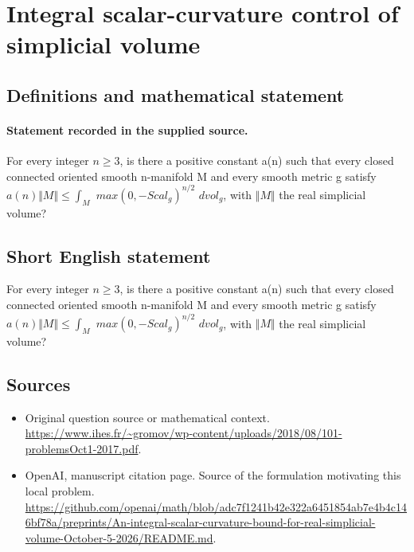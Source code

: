 \documentclass[11pt]{article}
\begin{document}
\section*{Integral scalar-curvature control of simplicial volume}\label{statement}
\subsection{Definitions and mathematical statement}
\paragraph{Statement recorded in the supplied source.}
For every integer $n\geq 3$, is there a positive constant a(n) such that every closed connected oriented smooth n-manifold M and every smooth metric g satisfy $a(n)\Vert M\Vert \leq \int _M$ $max(0,-Scal_g)^{n/2}$ $dvol_g$, with $\Vert M\Vert $ the real simplicial volume?
\subsection{Short English statement}
For every integer $n\geq 3$, is there a positive constant a(n) such that every closed connected oriented smooth n-manifold M and every smooth metric g satisfy $a(n)\Vert M\Vert \leq \int _M$ $max(0,-Scal_g)^{n/2}$ $dvol_g$, with $\Vert M\Vert $ the real simplicial volume?
\subsection{Sources}
\begin{itemize}
\item[S1] Original question source or mathematical context.
\url{https://www.ihes.fr/~gromov/wp-content/uploads/2018/08/101-problemsOct1-2017.pdf}.
\item[S2] OpenAI, manuscript citation page. Source of the formulation motivating this local problem.
\url{https://github.com/openai/math/blob/adc7f1241b42e322a6451854ab7e4b4c146bf78a/preprints/An-integral-scalar-curvature-bound-for-real-simplicial-volume-October-5-2026/README.md}.
\end{itemize}
\end{document}
